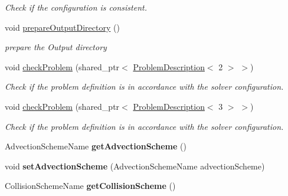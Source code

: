 \begin{DoxyCompactItemize}
\begin{DoxyCompactList}\small\item\em Check if the configuration is consistent. \item\end{DoxyCompactList}\item 
void \hyperlink{classnatrium_1_1SolverConfiguration_a69c009fd87690677b66ab10a000d07f6}{prepareOutputDirectory} ()
\begin{DoxyCompactList}\small\item\em prepare the Output directory \item\end{DoxyCompactList}\item 
void \hyperlink{classnatrium_1_1SolverConfiguration_a5299ddfbe762f89f2cd0dfa01bc70685}{checkProblem} (shared\_\-ptr$<$ \hyperlink{classnatrium_1_1ProblemDescription}{ProblemDescription}$<$ 2 $>$ $>$)
\begin{DoxyCompactList}\small\item\em Check if the problem definition is in accordance with the solver configuration. \item\end{DoxyCompactList}\item 
void \hyperlink{classnatrium_1_1SolverConfiguration_ae889a75ea132979964b8c9dcf631956b}{checkProblem} (shared\_\-ptr$<$ \hyperlink{classnatrium_1_1ProblemDescription}{ProblemDescription}$<$ 3 $>$ $>$)
\begin{DoxyCompactList}\small\item\em Check if the problem definition is in accordance with the solver configuration. \item\end{DoxyCompactList}\item 
\hypertarget{classnatrium_1_1SolverConfiguration_aaf32180358f99d78d56b3435dff11a11}{
AdvectionSchemeName {\bfseries getAdvectionScheme} ()}
\label{classnatrium_1_1SolverConfiguration_aaf32180358f99d78d56b3435dff11a11}

\item 
\hypertarget{classnatrium_1_1SolverConfiguration_a4fef165cd5a17247203af08846ec0f31}{
void {\bfseries setAdvectionScheme} (AdvectionSchemeName advectionScheme)}
\label{classnatrium_1_1SolverConfiguration_a4fef165cd5a17247203af08846ec0f31}

\item 
\hypertarget{classnatrium_1_1SolverConfiguration_a90e61c6fa9387a1cbf5943674bf307a8}{
CollisionSchemeName {\bfseries getCollisionScheme} ()}
\label{classnatrium_1_1SolverConfiguration_a90e61c6fa9387a1cbf5943674bf307a8}


\end{DoxyCompactItemize}
